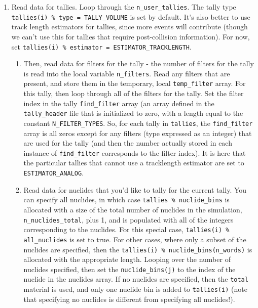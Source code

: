 \documentclass[10pt]{article}
\numberwithin{equation}{section} %
\begin{document}
\begin{enumerate}
\begin{enumerate}
	\item Read data for tallies. Loop through the {\tt n\_user\_tallies}. The tally type {\tt tallies(i) \% type = TALLY\_VOLUME} is set by default. It's also better to use track length estimators for tallies, since more events will contribute (though we can't use this for tallies that require post-collision information). For now, set {\tt tallies(i) \% estimator = ESTIMATOR\_TRACKLENGTH}. 
		\begin{enumerate}
		\item Then, read data for filters for the tally - the number of filters for the tally is read into the local variable {\tt n\_filters}. Read any filters that are present, and store them in the temporary, local {\tt temp\_filter} array. For this tally, then loop through all of the filters for the tally. Set the filter index in the tally {\tt find\_filter} array (an array defined in the {\tt tally\_header} file that is initialized to zero, with a length equal to the constant {\tt N\_FILTER\_TYPES}. So, for each tally in {\tt tallies}, the {\tt find\_filter} array is all zeros except for any filters (type expressed as an integer) that are used for the tally (and then the number actually stored in each instance of {\tt find\_filter} corresponds to the filter index). It is here that the particular tallies that cannot use a tracklength estimator are set to {\tt ESTIMATOR\_ANALOG}. 
		\item Read data for nuclides that you'd like to tally for the current tally. You can specify all nuclides, in which case {\tt tallies \% nuclide\_bins} is allocated with a size of the total number of nuclides in the simulation, {\tt n\_nuclides\_total}, plus 1, and is populated with all of the integers corresponding to the nuclides. For this special case, {\tt tallies(i) \% all\_nuclides} is set to true. For other cases, where only a subset of the nuclides are specified, then the {\tt tallies(i) \% nuclide\_bins(n\_words)} is allocated with the appropriate length. Looping over the number of nuclides specified, then set the {\tt nuclide\_bins(j)} to the index of the nuclide in the nuclides array. If no nuclides are specified, then the {\tt total} material is used, and only one nuclide bin is added to {\tt tallies(i)} (note that specifying no nuclides is different from specifying all nuclides!). 

\end{enumerate}
\end{enumerate}
\end{enumerate}
\end{document}
